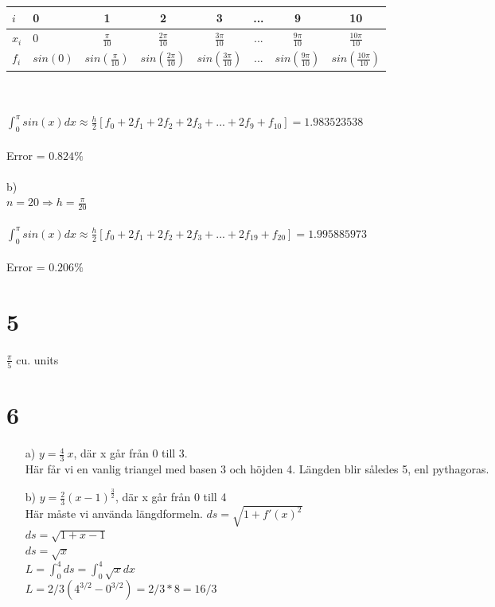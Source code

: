 \documentclass{article}
\begin{document}
\begin{tabular}{l|l*{6}{c}} \\
$i$     & 0 & 1 & 2 & 3 & ...  & 9 & 10 \\
\hline
$x_i$   & 0 & $\frac{\pi}{10}$ & $\frac{2 \pi}{10}$ & $\frac{3 \pi}{10}$ & 
        ... & $\frac{9 \pi}{10}$ & $\frac{10 \pi}{10}$  \\
        [5pt]
$f_i$   & $sin(0)$ & $sin(\frac{\pi}{10})$ & $sin(\frac{2 \pi}{10})$ & 
        $sin(\frac{3 \pi}{10})$ & ... & $sin(\frac{9 \pi}{10})$ & 
        $sin(\frac{10 \pi}{10})$ \\
\end{tabular}\\\\
[20pt]
$\int_0^{\pi} sin(x) dx \approx \frac{h}{2}[f_0 + 2f_1 + 2f_2 + 2f_3 + ... + 2f_9 + f_{10}]
 = 1.983 523 538$\\\\
Error = $0.824\%$\\\\
\noindent
b) \\
\noindent
$n = 20 \Rightarrow h = \frac{\pi}{20}$\\\\
$\int_0^{\pi} sin(x) dx \approx \frac{h}{2}[f_0 + 2f_1 + 2f_2 + 2f_3 + ... + 2f_{19} + f_{20}]
= 1.995 885 973$\\\\
Error = $0.206\%$


\section*{5}
$\frac{\pi}{5}$ cu. units

\clearpage
\section*{6}
\begin{itemize}
	\item[a) ] $y = \frac{4}{3} \> x$, där x går från 0 till 3. \\
			 Här får vi en vanlig triangel med basen 3 och höjden 4. Längden blir således 5, enl pythagoras. 
			 
	\item[b) ] 	$y = \frac{2}{3} (x-1)^{ \frac{3}{2} }$, där x går från 0 till 4 \\
				Här måste vi använda längdformeln. 
				$ds = \sqrt{1 + f'(x)^2}$ \\
				$ds = \sqrt{1 + x-1} $ \\
				$ds = \sqrt{x} $ \\
				$L = \int_{0}^{4} ds = \int_{0}^{4} \sqrt{x} dx $ \\
				$L =  2/3 ( 4^{3/2} - 0^{3/2} ) = 2/3 * 8 = 16/3 $
\end{itemize}
\end{document}
